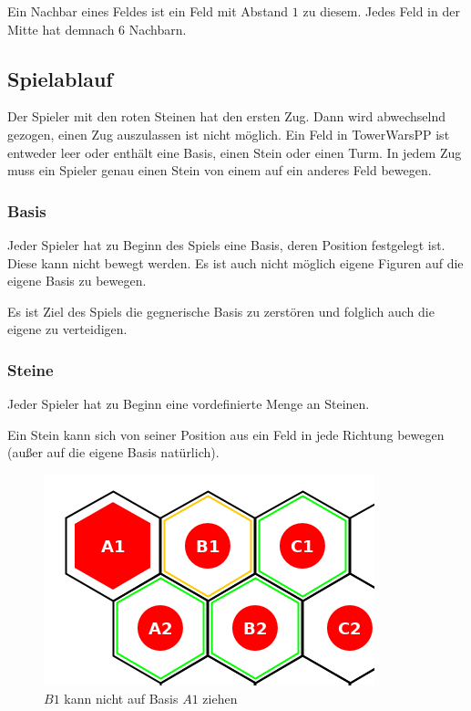Ein Nachbar eines Feldes ist ein Feld mit Abstand $1$ zu diesem. Jedes Feld in der Mitte hat demnach $6$ Nachbarn.

\subsection*{Spielablauf}
Der Spieler mit den roten Steinen hat den ersten Zug. Dann wird abwechselnd gezogen, einen Zug auszulassen ist nicht möglich. Ein Feld in TowerWarsPP ist entweder leer oder enthält eine Basis, einen Stein oder einen Turm. In jedem Zug muss ein Spieler genau einen Stein von einem auf ein anderes Feld bewegen.

\subsubsection*{Basis}
Jeder Spieler hat zu Beginn des Spiels eine Basis, deren Position festgelegt ist. Diese kann nicht bewegt werden. Es ist auch nicht möglich eigene Figuren auf die eigene Basis zu bewegen.

Es ist Ziel des Spiels die gegnerische Basis zu zerstören und folglich auch die eigene zu verteidigen.

\subsubsection*{Steine}
Jeder Spieler hat zu Beginn eine vordefinierte Menge an Steinen. 

Ein Stein kann sich von seiner Position aus ein Feld in jede Richtung bewegen (außer auf die eigene Basis natürlich).
\begin{figure}[ht]
\begin{center}
\includegraphics[scale=0.25]{graphic/token-nobase.png} \\
\smallskip
{\footnotesize $B1$ kann nicht auf Basis $A1$ ziehen}
\end{center}
\end{figure}

